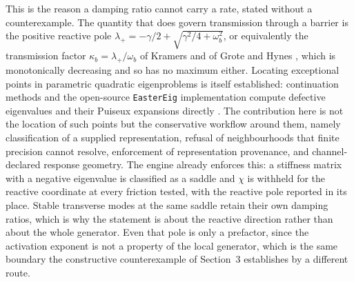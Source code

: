 This is the reason a damping ratio cannot carry a rate, stated without a counterexample. The quantity that does govern transmission through a barrier is the positive reactive pole \(\lambda_+ = -\gamma/2 + \sqrt{\gamma^2/4 + \omega_b^2}\), or equivalently the transmission factor \(\kappa_b = \lambda_+/\omega_b\) of Kramers and of Grote and Hynes \citep{hanggi1990}, which is monotonically decreasing and so has no maximum either. Locating exceptional points in parametric quadratic eigenproblems is itself established: continuation methods and the open-source \texttt{EasterEig} implementation compute defective eigenvalues and their Puiseux expansions directly \citep{eastereig}. The contribution here is not the location of such points but the conservative workflow around them, namely classification of a supplied representation, refusal of neighbourhoods that finite precision cannot resolve, enforcement of representation provenance, and channel-declared response geometry. The engine already enforces this: a stiffness matrix with a negative eigenvalue is classified as a saddle and \(\chi\) is withheld for the reactive coordinate at every friction tested, with the reactive pole reported in its place. Stable transverse modes at the same saddle retain their own damping ratios, which is why the statement is about the reactive direction rather than about the whole generator. Even that pole is only a prefactor, since the activation exponent is not a property of the local generator, which is the same boundary the constructive counterexample of Section~3 establishes by a different route.
